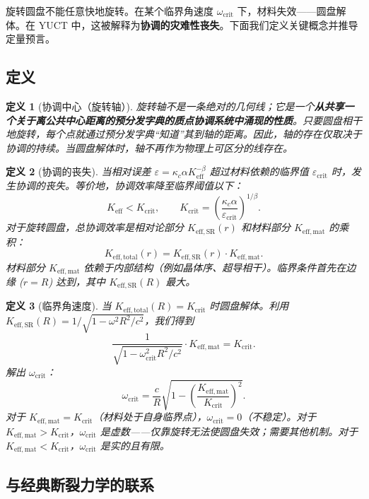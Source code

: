 \documentclass[12pt,a4paper]{article}
\newtheorem{definition}{定义}[section]
\newcommand{\kappac}{\kappa_c}
\newcommand{\betaf}{\beta}
\newcommand{\Keff}{K_{\mathrm{eff}}}
\newcommand{\Keffmat}{K_{\mathrm{eff,mat}}}
\newcommand{\Kefftot}{K_{\mathrm{eff,total}}}
\newcommand{\KeffSR}{K_{\mathrm{eff,SR}}}
\newcommand{\Kcrit}{K_{\mathrm{crit}}}
\begin{document}
	旋转圆盘不能任意快地旋转。在某个临界角速度 \(\omega_{\text{crit}}\) 下，材料失效——圆盘解体。在 YUCT 中，这被解释为\textbf{协调的灾难性丧失}。下面我们定义关键概念并推导定量预言。
	
	\subsection{定义}
	
	\begin{definition}[协调中心（旋转轴）]
		旋转轴不是一条绝对的几何线；它是一个\textbf{从共享一个关于离公共中心距离的预分发字典的质点协调系统中涌现的性质}。只要圆盘相干地旋转，每个点就通过预分发字典“知道”其到轴的距离。因此，轴的存在仅取决于协调的持续。当圆盘解体时，轴不再作为物理上可区分的线存在。
	\end{definition}
	
	\begin{definition}[协调的丧失]
		当相对误差 \(\varepsilon = \kappac \alpha K_{\mathrm{eff}}^{-\betaf}\) 超过材料依赖的临界值 \(\varepsilon_{\text{crit}}\) 时，发生协调的丧失。等价地，协调效率降至临界阈值以下：
		\[
		\Keff < \Kcrit, \qquad \Kcrit = \left( \frac{\kappac \alpha}{\varepsilon_{\text{crit}}} \right)^{1/\betaf}.
		\]
		对于旋转圆盘，总协调效率是相对论部分 \(K_{\mathrm{eff,SR}}(r)\) 和材料部分 \(K_{\mathrm{eff,mat}}\) 的乘积：
		\[
		\Kefftot(r) = \KeffSR(r) \cdot \Keffmat.
		\]
		材料部分 \(K_{\mathrm{eff,mat}}\) 依赖于内部结构（例如晶体序、超导相干）。临界条件首先在边缘 (\(r = R\)) 达到，其中 \(\KeffSR(R)\) 最大。
	\end{definition}
	
	\begin{definition}[临界角速度]
		当 \(\Kefftot(R) = \Kcrit\) 时圆盘解体。利用 \(\KeffSR(R) = 1/\sqrt{1 - \omega^2 R^2/c^2}\)，我们得到
		\[
		\frac{1}{\sqrt{1 - \omega_{\text{crit}}^2 R^2/c^2}} \cdot \Keffmat = \Kcrit.
		\]
		解出 \(\omega_{\text{crit}}\)：
		\[
		\boxed{\omega_{\text{crit}} = \frac{c}{R} \sqrt{1 - \left( \frac{\Keffmat}{\Kcrit} \right)^2 }}.
		\]
		对于 \(\Keffmat = \Kcrit\)（材料处于自身临界点），\(\omega_{\text{crit}} = 0\)（不稳定）。对于 \(\Keffmat > \Kcrit\)，\(\omega_{\text{crit}}\) 是虚数——仅靠旋转无法使圆盘失效；需要其他机制。对于 \(\Keffmat < \Kcrit\)，\(\omega_{\text{crit}}\) 是实的且有限。
	\end{definition}
	
	\subsection{与经典断裂力学的联系}
	
\end{document}
